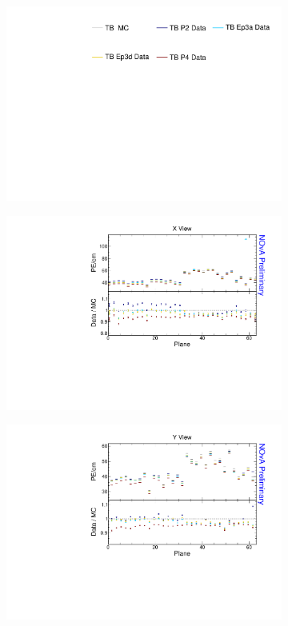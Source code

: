 \begin{figure}[!ht]
  \begin{subfigure}{\textwidth}
  \centering
    \includegraphics[height=0.2\linewidth]{Plots/Calibana/legend.pdf}
  \end{subfigure}
  \vspace*{2mm}

  \begin{subfigure}{0.495\textwidth}
    \includegraphics[width=\linewidth]{Plots/Calibana/pecm_plane_x.pdf}
  \end{subfigure}
  \begin{subfigure}{0.495\textwidth}
    \includegraphics[width=\linewidth]{Plots/Calibana/pecm_plane_y.pdf}

\end{subfigure}
\end{figure}
